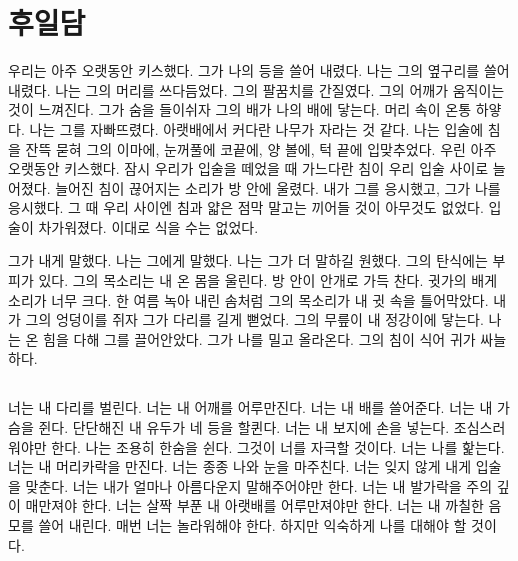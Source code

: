 \hypertarget{uxd6c4uxc77cuxb2f4}{%

\chapter{후일담}\label{uxd6c4uxc77cuxb2f4}}



우리는 아주 오랫동안 키스했다. 그가 나의 등을 쓸어 내렸다. 나는 그의 옆구리를 쓸어 내렸다. 나는 그의 머리를 쓰다듬었다. 그의 팔꿈치를 간질였다. 그의 어깨가 움직이는 것이 느껴진다. 그가 숨을 들이쉬자 그의 배가 나의 배에 닿는다. 머리 속이 온통 하얗다. 나는 그를 자빠뜨렸다. 아랫배에서 커다란 나무가 자라는 것 같다. 나는 입술에 침을 잔뜩 묻혀 그의 이마에, 눈꺼풀에 코끝에, 양 볼에, 턱 끝에 입맞추었다. 우린 아주 오랫동안 키스했다. 잠시 우리가 입술을 떼었을 때 가느다란 침이 우리 입술 사이로 늘어졌다. 늘어진 침이 끊어지는 소리가 방 안에 울렸다. 내가 그를 응시했고, 그가 나를 응시했다. 그 때 우리 사이엔 침과 얇은 점막 말고는 끼어들 것이 아무것도 없었다. 입술이 차가워졌다. 이대로 식을 수는 없었다.



그가 내게 말했다. 나는 그에게 말했다. 나는 그가 더 말하길 원했다. 그의 탄식에는 부피가 있다. 그의 목소리는 내 온 몸을 울린다. 방 안이 안개로 가득 찬다. 귓가의 배게 소리가 너무 크다. 한 여름 녹아 내린 솜처럼 그의 목소리가 내 귓 속을 틀어막았다. 내가 그의 엉덩이를 쥐자 그가 다리를 길게 뻗었다. 그의 무릎이 내 정강이에 닿는다. 나는 온 힘을 다해 그를 끌어안았다. 그가 나를 밀고 올라온다. 그의 침이 식어 귀가 싸늘하다.



\hypertarget{section}{%

\section{}\label{section}}



너는 내 다리를 벌린다. 너는 내 어깨를 어루만진다. 너는 내 배를 쓸어준다. 너는 내 가슴을 쥔다. 단단해진 내 유두가 네 등을 할퀸다. 너는 내 보지에 손을 넣는다. 조심스러워야만 한다. 나는 조용히 한숨을 쉰다. 그것이 너를 자극할 것이다. 너는 나를 핥는다. 너는 내 머리카락을 만진다. 너는 종종 나와 눈을 마주친다. 너는 잊지 않게 내게 입술을 맞춘다. 너는 내가 얼마나 아름다운지 말해주어야만 한다. 너는 내 발가락을 주의 깊이 매만져야 한다. 너는 살짝 부푼 내 아랫배를 어루만져야만 한다. 너는 내 까칠한 음모를 쓸어 내린다. 매번 너는 놀라워해야 한다. 하지만 익숙하게 나를 대해야 할 것이다.



